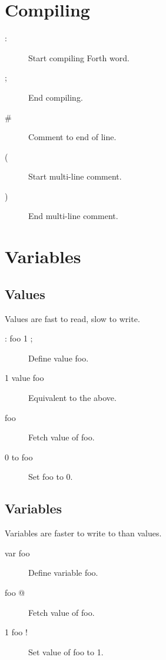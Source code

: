 \section{Compiling}

\begin{description}
\item[:]

Start compiling Forth word.

\item[;]

End compiling.

\item[\#]

Comment to end of line.

\item[(]

Start multi-line comment.

\item[)]

End multi-line comment.

\end{description}

\section{Variables}

\subsection{Values}

Values are fast to read, slow to write.

\begin{description}
\item[: foo 1 ;] Define value foo.
\item[1 value foo] Equivalent to the above.
\item[foo] Fetch value of foo.
\item[0 to foo] Set foo to 0.
\end{description}

\subsection{Variables}

Variables are faster to write to than values.

\begin{description}
\item[var foo] Define variable foo.
\item[foo @] Fetch value of foo.
\item[1 foo !] Set value of foo to 1.
\end{description}

